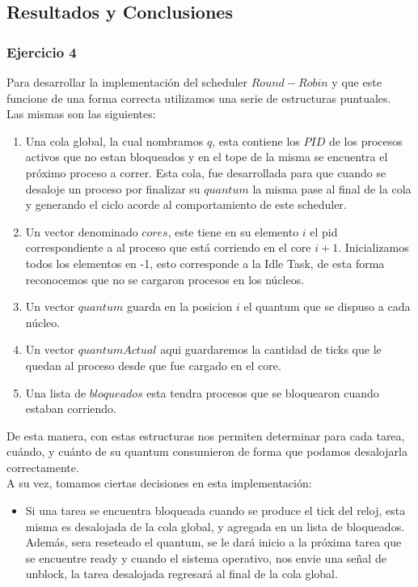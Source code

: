 \subsection{Resultados y Conclusiones}

\subsubsection[Resolución Ejercicio 4]{Ejercicio 4}
Para desarrollar la implementación del scheduler $Round-Robin$ y que este funcione de una forma correcta
utilizamos una serie de estructuras puntuales. \\
Las mismas son las siguientes:\\
\begin{enumerate}
 \item Una cola global, la cual nombramos $q$, esta contiene los $PID$ de los procesos activos que no estan
 bloqueados y en el tope de la misma se encuentra el próximo proceso a correr. Esta cola,
 fue desarrollada para que cuando se desaloje un proceso por finalizar su $quantum$ la misma pase al final de
 la cola y generando el ciclo acorde al comportamiento de este scheduler.
 \item Un vector denominado $cores$, este tiene en su elemento $i$ el pid correspondiente a
al proceso que está corriendo en el core $i+1$. Inicializamos todos los elementos en -1, esto
corresponde a la Idle Task, de esta forma reconocemos que no se cargaron procesos en los núcleos.
\item Un vector $quantum$ guarda en la posicion $i$ el quantum que se dispuso a cada núcleo.
\item Un vector $quantumActual$ aqui guardaremos la cantidad de ticks que le quedan al proceso
desde que fue cargado en el core.
\item Una lista de $bloqueados$ esta tendra procesos que se bloquearon cuando estaban corriendo.
\end{enumerate}

De esta manera, con estas estructuras nos permiten determinar para cada tarea, cuándo, y cuánto 
de su quantum consumieron de forma que podamos desalojarla correctamente.\\

A su vez, tomamos ciertas decisiones en esta implementación:
\begin{itemize}
 \item Si una tarea se encuentra bloqueada cuando se produce el tick del reloj, esta misma es desalojada
de la cola global, y agregada en un lista de bloqueados. Además, sera reseteado el quantum, se le
dará inicio a la próxima tarea que se encuentre ready y cuando el sistema operativo, nos envie una
señal de unblock, la tarea desalojada regresará al final de la cola global.

\end{itemize}


